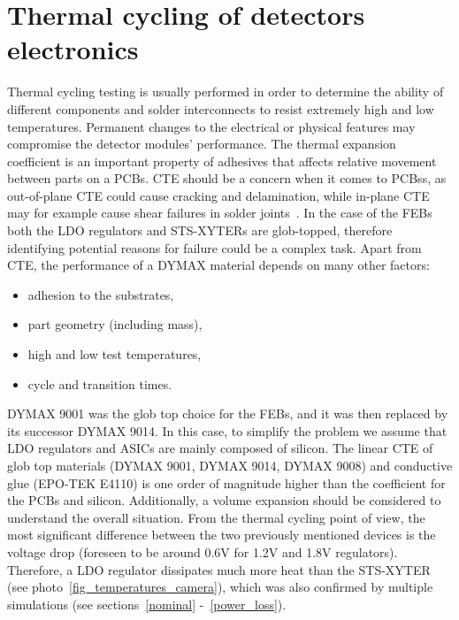 \newpage
\section{Thermal cycling of detectors electronics}
\label{thermal_cycling}
Thermal cycling testing is usually performed in order to determine the ability of different components and solder interconnects to resist extremely high and low temperatures. Permanent changes to the electrical or physical features may compromise the detector modules' performance. The thermal expansion coefficient is an important property of adhesives that affects relative movement between parts on a \glspl{PCB}. \gls{CTE} should be a concern when it comes to \glspl{PCB}s, as out-of-plane \gls{CTE} could cause cracking and delamination, while in-plane \gls{CTE} may for example cause shear failures in solder joints~\cite{cte_report}. In the case of the \gls{FEB}s both the \gls{LDO} regulators and \gls{STS}-XYTERs are glob-topped, therefore identifying potential reasons for failure could be a complex task. Apart from \gls{CTE}, the performance of a DYMAX material depends on many other factors:
\begin{itemize}
    \item adhesion to the substrates,
    \item part geometry (including mass),
    \item high and low test temperatures,
    \item cycle and transition times.
\end{itemize}
DYMAX 9001 was the glob top choice for the \glspl{FEB}, and it was then replaced by its successor DYMAX 9014. In this case, to simplify the problem we assume that \gls{LDO} regulators and \glspl{ASIC} are mainly composed of silicon. The linear CTE of glob top materials (DYMAX 9001, DYMAX 9014, DYMAX 9008) and conductive glue (EPO-TEK E4110) is one order of magnitude higher than the coefficient for the \glspl{PCB} and silicon. Additionally, a volume expansion should be considered to understand the overall situation. From the thermal cycling point of view, the most significant difference between the two previously mentioned devices is the voltage drop (foreseen to be around 0.6V for 1.2V and 1.8V regulators). Therefore, a \gls{LDO} regulator dissipates much more heat than the \gls{STS}-XYTER (see photo~\ref{fig_temperatures_camera}), which was also confirmed by multiple simulations (see sections~\ref{nominal} -~\ref{power_loss}).

